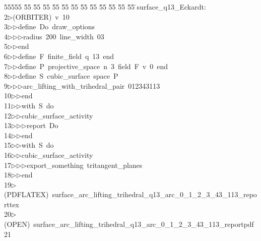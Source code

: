 %
%
\begin{tabbing}
55555 \= 55 \= 55 \= 55 \= 55 \= 55 \= 55 \= 55 \= 55 \= 55 \= 55 \= 55 \= 55 \= \>surface\_q13\_Eckardt:\\[0pt]
2\>$\triangleright$\>(ORBITER)\ v\ 10\ \\[0pt]
3\>$\triangleright$\>$\triangleright$\>define\ Do\ draw\_options\ \\[0pt]
4\>$\triangleright$\>$\triangleright$\>$\triangleright$\>radius\ 200\ line\_width\ 03\ \\[0pt]
5\>$\triangleright$\>$\triangleright$\>end\ \\[0pt]
6\>$\triangleright$\>$\triangleright$\>define\ F\ finite\_field\ q\ 13\ end\ \\[0pt]
7\>$\triangleright$\>$\triangleright$\>define\ P\ projective\_space\ n\ 3\ field\ F\ v\ 0\ end\ \\[0pt]
8\>$\triangleright$\>$\triangleright$\>define\ S\ cubic\_surface\ space\ P\ \\[0pt]
9\>$\triangleright$\>$\triangleright$\>$\triangleright$\>arc\_lifting\_with\_trihedral\_pair\ 012343113\ \\[0pt]
10\>$\triangleright$\>$\triangleright$\>end\ \\[0pt]
11\>$\triangleright$\>$\triangleright$\>with\ S\ do\ \\[0pt]
12\>$\triangleright$\>$\triangleright$\>cubic\_surface\_activity\ \\[0pt]
13\>$\triangleright$\>$\triangleright$\>$\triangleright$\>report\ Do\ \\[0pt]
14\>$\triangleright$\>$\triangleright$\>end\ \\[0pt]
15\>$\triangleright$\>$\triangleright$\>with\ S\ do\ \\[0pt]
16\>$\triangleright$\>$\triangleright$\>cubic\_surface\_activity\ \\[0pt]
17\>$\triangleright$\>$\triangleright$\>$\triangleright$\>export\_something\ tritangent\_planes\ \\[0pt]
18\>$\triangleright$\>$\triangleright$\>end\\[0pt]
19\>$\triangleright$\>(PDFLATEX)\ surface\_arc\_lifting\_trihedral\_q13\_arc\_0\_1\_2\_3\_43\_113\_reporttex\\[0pt]
20\>$\triangleright$\>(OPEN)\ surface\_arc\_lifting\_trihedral\_q13\_arc\_0\_1\_2\_3\_43\_113\_reportpdf\\[0pt]
21\>\end{tabbing}
